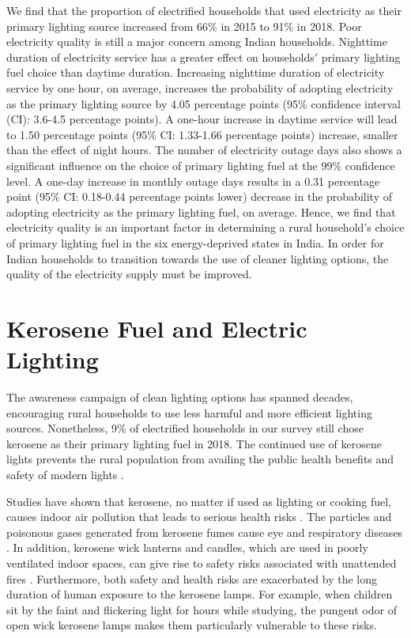 \documentclass[11pt,english]{article}
\theoremstyle{plain} \newtheorem{claim}{Claim}
\theoremstyle{plain} \newtheorem{prop}{Proposition}
\theoremstyle{plain} \newtheorem{hypo}{Hypothesis}
\begin{document}
We find that the proportion of electrified households that used electricity as their primary lighting source increased from 66\% in 2015 to 91\% in 2018. Poor electricity quality is still a major concern among Indian households. Nighttime duration of electricity service has a greater effect on households$'$ primary lighting fuel choice than daytime duration. Increasing nighttime duration of electricity service by one hour, on average, increases the probability of adopting electricity as the primary lighting source by 4.05 percentage points (95\% confidence interval (CI): 3.6-4.5 percentage points). A one-hour increase in daytime service will lead to 1.50 percentage points (95\% CI: 1.33-1.66 percentage points) increase, smaller than the effect of night hours. The number of electricity outage days also shows a significant influence on the choice of primary lighting fuel at the 99\% confidence level. A one-day increase in monthly outage days results in a 0.31 percentage point (95\% CI: 0.18-0.44 percentage points lower) decrease in the probability of adopting electricity as the primary lighting fuel, on average. Hence, we find that electricity quality is an important factor in determining a rural household$’$s choice of primary lighting fuel in the six energy-deprived states in India. In order for Indian households to transition towards the use of cleaner lighting options, the quality of the electricity supply must be improved.


\section{Kerosene Fuel and Electric Lighting}

The awareness campaign of clean lighting options has spanned decades, encouraging rural households to use less harmful and more efficient lighting sources. Nonetheless, 9\% of electrified households in our survey still chose kerosene as their primary lighting fuel in 2018. The continued use of kerosene lights prevents the rural population from availing the public health benefits and safety of modern lights \citep{BarronTorero2017}.

Studies have shown that kerosene, no matter if used as lighting or cooking fuel, causes indoor air pollution that leads to serious health risks \citep{Lametal2012}. The particles and poisonous gases generated from kerosene fumes cause eye and respiratory diseases \citep{Lametal2012, Appleetal2010}. In addition, kerosene wick lanterns and candles, which are used in poorly ventilated indoor spaces, can give rise to safety risks associated with unattended fires \citep{BringulaBalahadia2019}. Furthermore, both safety and health risks are exacerbated by the long duration of human exposure to the kerosene lamps. For example, when children sit by the faint and flickering light for hours while studying, the pungent odor of open wick kerosene lamps makes them particularly vulnerable to these risks.
\end{document}
